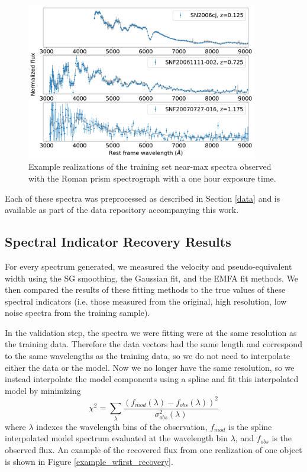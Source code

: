 \begin{figure}[htbp]
    \centering
    \includegraphics[width=0.9\textwidth]{figures/si_feat_pca/wfirst_example_spectra.pdf}
    \caption{Example realizations of the training set near-max spectra observed with the Roman prism spectrograph with a one hour exposure time.}
    \label{wfirst_example_spectra}
\end{figure}

Each of these spectra was preprocessed as described in Section \ref{data} and is available as part of the data repository accompanying this work.

\subsection{Spectral Indicator Recovery Results}
For every spectrum generated, we measured the velocity and pseudo-equivalent width using the SG smoothing, the Gaussian fit, and the EMFA fit methods. We then compared the results of these fitting methods to the true values of these spectral indicators (i.e. those measured from the original, high resolution, low noise spectra from the training sample).

In the validation step, the spectra we were fitting were at the same resolution as the training data. Therefore the data vectors had the same length and correspond to the same wavelengths as the training data, so we do not need to interpolate either the data or the model. Now we no longer have the same resolution, so we instead interpolate the model components using a spline and fit this interpolated model by minimizing
\begin{equation}
    \chi^2 = \displaystyle\sum_\lambda \frac{(f_{mod}(\lambda)-f_{obs}(\lambda))^2}{\sigma_{obs}^2(\lambda)}
\end{equation}
where $\lambda$ indexes the wavelength bins of the observation, $f_{mod}$ is the spline interpolated model spectrum evaluated at the wavelength bin $\lambda$, and $f_{obs}$ is the observed flux. An example of the recovered flux from one realization of one object is shown in Figure \ref{example_wfirst_recovery}.

